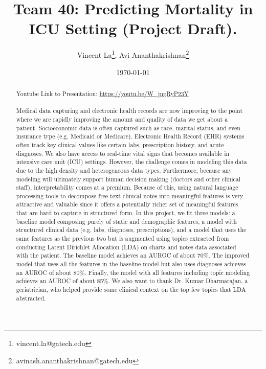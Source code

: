 \documentclass[12pt, final]{article}
\renewcommand{\thefootnote}{$\star$}
\begin{document}
\title{Team 40: Predicting Mortality in ICU Setting (Project Draft).}

\date{\today}

\renewcommand{\thefootnote}{$\dag$}
\author{Vincent La\footnote{vincent.la@gatech.edu}, Avi Ananthakrishnan\footnote{avinash.ananthakrishnan@gatech.edu}}

\maketitle

\begin{abstract}
Youtube Link to Presentation: \href{https://youtu.be/W\_jngRyP23Y}{https://youtu.be/W\_jngRyP23Y}
\\
\\
Medical data capturing and electronic health records are now improving to the point where we are rapidly improving the amount and quality of data we get about a patient. Socioeconomic data is often captured such as race, marital status, and even insurance type (e.g. Medicaid or Medicare). Electronic Health Record (EHR) systems often track key clinical values like certain labs, prescription history, and acute diagnoses. We also have access to real-time vital signs that becomes available in intensive care unit (ICU) settings. However, the challenge comes in modeling this data due to the high density and heterogeneous data types. Furthermore, because any modeling will ultimately support human decision making (doctors and other clinical staff), interpretability comes at a premium. Because of this, using natural language processing tools to decompose free-text clinical notes into meaningful features is very attractive and valuable since it offers a potentially richer set of meaningful features that are hard to capture in structured form. In this project, we fit three models: a baseline model composing purely of static and demographic features, a model with structured clinical data (e.g. labs, diagnoses, prescriptions), and a model that uses the same features as the previous two but is augmented using topics extracted from conducting Latent Dirichlet Allocation (LDA) on charts and notes data associated with the patient. The baseline model achieves an AUROC of about 70\%. The improved model that uses all the features in the baseline model but also uses diagnoses achieves an AUROC of about 80\%. Finally, the model with all features including topic modeling achieves an AUROC of about 85\%. We also want to thank Dr. Kumar Dharmarajan, a geriatrician, who helped provide some clinical context on the top few topics that LDA abstracted.
\end{abstract} 
\end{document}

